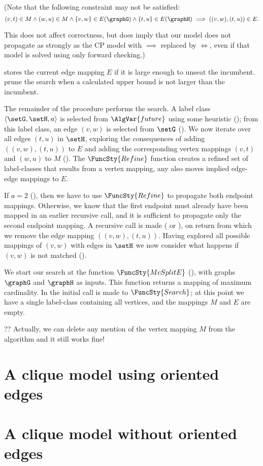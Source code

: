 (Note that the following constraint may not be satisfied:
\[
(v,t) \in M \wedge (w,u) \in M \wedge \{v,w\} \in E(\graphG) \wedge \{t,u\} \in E(\graphH) \implies ((v,w),(t,u)) \in E.
\]

This does not affect correctness, but does imply that our model does not propagate as strongly as
the CP model with $\implies$ replaced by $\Longleftrightarrow$,
even if that model is solved using only forward checking.)

 stores the current edge mapping $E$ if it is large enough
to unseat the incumbent.   prune the
search when a calculated upper bound is not larger than the incumbent.

The remainder of the procedure performs the search.  A label class $\langle
\setG, \setH, a \rangle$ is selected from $\AlgVar{future}$ using some
heuristic (); from this label class, an edge $(v,w)$ is
selected from $\setG$ (). We now iterate over all edges
$(t,u)$ in $\setH$, exploring the consequences of adding $((v,w),(t,u))$ to $E$
and adding the corresponding vertex mappings $(v,t)$ and $(w,u)$ to $M$
().  The $\FuncSty{Refine}$ function
creates a refined set of label-classes that results from a vertex mapping,
any also moves implied edge-edge mappings to $E$.

If $a=2$ (), then we have to use $\FuncSty{Refine}$ to propagate
both endpoint mappings.  Otherwise, we know that the first endpoint must already have
been mapped in an earlier recursive call, and it is sufficient to propagate only the second
endpoint mapping.  
A recursive call is made ( or ),
on return from which we remove the edge mapping $((v,w),(t,u))$.
Having explored all possible mappings of $(v,w)$ with edges in $\setH$ we now
consider what happens if $(v,w)$ is not matched
().

We start our search at the function $\FuncSty{McSplitE}$ (),
with graphs $\graphG$ and $\graphH$ as inputs.  This function returns a mapping of
maximum cardinality.  In  the initial call is made to
$\FuncSty{Search}$; at this point we have a single label-class containing all
vertices, and the mappings $M$ and $E$ are empty.

?? Actually, we can delete any mention of the vertex mapping $M$ from the algorithm and it still works fine!

\section{A clique model using oriented edges}

\section{A clique model without oriented edges}
